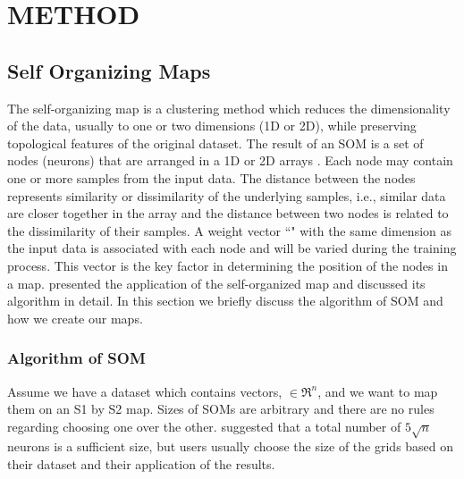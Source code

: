 
\section{METHOD}
\label{sec: method_somz}
 \subsection{Self Organizing Maps}
 \label{sec: som}
 
 The self-organizing map is a clustering method which reduces the dimensionality of the data, usually to one or two dimensions (1D or 2D), while preserving topological features of the original dataset.
 The result of an SOM is a set of nodes (neurons) that are arranged in a 1D or 2D arrays \citep{Kohonen98}. 
 Each node may contain one or more samples from the input data.
 The distance between the nodes represents similarity or dissimilarity of the underlying samples, i.e., similar data are closer together in the array and the distance between two nodes is related to the dissimilarity of their samples.
 A weight vector ``" with the same dimension as the input data is associated with each node and will be varied during the training process.
 This vector is the key factor in determining the position of the nodes in a map.
 \cite{Geach12} presented the application of the self-organized map and discussed its algorithm in detail.
 In this section we briefly discuss the algorithm of SOM and how we create our maps. 
 
 \subsubsection{Algorithm of SOM} 
 \label{sec: algorithm}
     Assume we have a dataset which contains vectors,  $\in \Re^n$, and we want to map them on an S1 by S2 map. 
     Sizes of SOMs are arbitrary and there are no rules regarding choosing one over the other. 
    \citet{Vesanto05} suggested that a total number of $5\sqrt{n}$ neurons is a sufficient size, but users usually choose the size of the grids based on their dataset and their application of the results.

